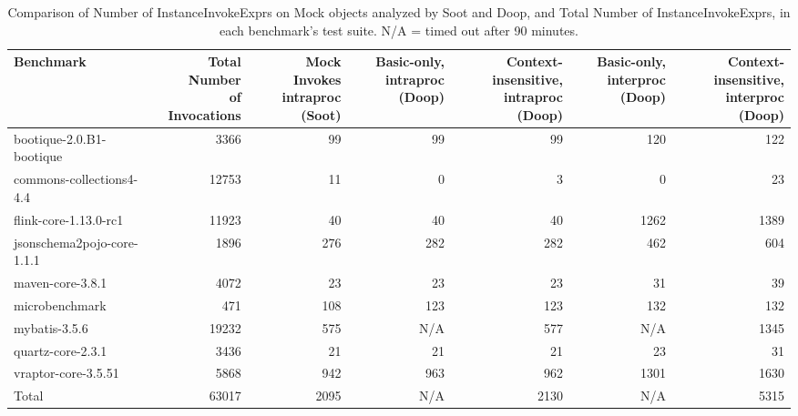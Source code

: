 \begin{table*}
	\centering
	\caption{Comparison of Number of InstanceInvokeExprs on Mock objects analyzed by Soot and Doop, and Total Number of InstanceInvokeExprs, in each benchmark's test suite. N/A = timed out after 90 minutes.}
	\begin{tabular}{lrrrrrr}
		\toprule
		Benchmark & \thead{Total Number \\ of Invocations} & \thead{Mock Invokes \\ intraproc (Soot)} & \thead{Basic-only, \\ intraproc (Doop)} & \thead{Context-insensitive, \\ intraproc (Doop)} &  \thead{Basic-only, \\ interproc (Doop)} &\thead{Context-insensitive, \\ interproc (Doop)} \\
		\midrule
		bootique-2.0.B1-bootique           		&  3366     &  99   & 99    & 99   & 120   & 122    \\
		commons-collections4-4.4       			&  12753    &  11   & 0     &  3   & 0    & 23   \\
		flink-core-1.13.0-rc1           		&  11923    &  40   & 40    & 40   & 1262  & 1389   \\
		jsonschema2pojo-core-1.1.1      	     	&  1896     &  276  & 282   & 282  & 462   & 604   \\
		maven-core-3.8.1           			&  4072     &  23   & 23    & 23   & 31    & 39  \\
		microbenchmark         		  		&  471      &  108  & 123   & 123  & 132   & 132   \\
		mybatis-3.5.6         		  		&  19232    &  575  & N/A   & 577  &  N/A  & 1345     \\
		quartz-core-2.3.1       	  		&  3436     &  21   & 21    & 21   & 23    & 31    \\
		vraptor-core-3.5.51        	  		&  5868     &  942  & 963   & 962  & 1301  & 1630   \\
		\bottomrule
		Total        	  				&  63017    & 2095  & N/A   & 2130  & N/A  & 5315   \\
	\end{tabular}
	\label{tab:invokes}
\end{table*}

